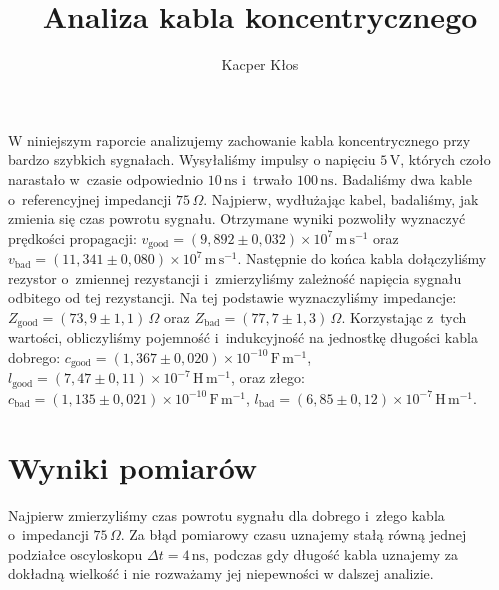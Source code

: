 \documentclass[12pt]{article}
\title{Analiza kabla koncentrycznego}
\author{Kacper Kłos}
\date{}
\begin{document}
\maketitle

W niniejszym raporcie analizujemy zachowanie kabla koncentrycznego przy bardzo szybkich sygnałach. Wysyłaliśmy impulsy o napięciu \(5\,\mathrm{V}\), których czoło narastało w~czasie odpowiednio \(10\,\mathrm{ns}\) i~trwało \(100\,\mathrm{ns}\). Badaliśmy dwa kable o~referencyjnej impedancji \(75\,\Omega\). \newline
Najpierw, wydłużając kabel, badaliśmy, jak zmienia się czas powrotu sygnału. Otrzymane wyniki pozwoliły wyznaczyć prędkości propagacji: \(v_{\mathrm{good}}=(9{,}892\pm0{,}032)\times10^{7}\,\mathrm{m\,s^{-1}}\) oraz \(v_{\mathrm{bad}}=(11{,}341\pm0{,}080)\times10^{7}\,\mathrm{m\,s^{-1}}\). \newline
Następnie do końca kabla dołączyliśmy rezystor o~zmiennej rezystancji i~zmierzyliśmy zależność napięcia sygnału odbitego od tej rezystancji. Na tej podstawie wyznaczyliśmy impedancje: \(Z_{\mathrm{good}}=(73{,}9\pm1{,}1)\,\Omega\) oraz \(Z_{\mathrm{bad}}=(77{,}7\pm1{,}3)\,\Omega\). \newline
Korzystając z~tych wartości, obliczyliśmy pojemność i~indukcyjność na jednostkę długości kabla dobrego: \(c_{\mathrm{good}}=(1{,}367\pm0{,}020)\times10^{-10}\,\mathrm{F\,m^{-1}}\), \(l_{\mathrm{good}}=(7{,}47\pm0{,}11)\times10^{-7}\,\mathrm{H\,m^{-1}}\), oraz złego: \(c_{\mathrm{bad}}=(1{,}135\pm0{,}021)\times10^{-10}\,\mathrm{F\,m^{-1}}\), \(l_{\mathrm{bad}}=(6{,}85\pm0{,}12)\times10^{-7}\,\mathrm{H\,m^{-1}}\).

\newpage

\section{Wyniki pomiarów}
Najpierw zmierzyliśmy czas powrotu sygnału dla dobrego i~złego kabla o~impedancji \(75\,\Omega\).
Za błąd pomiarowy czasu uznajemy stałą równą jednej podziałce oscyloskopu $\Delta t = 4 \, \mathrm{ns}$, podczas gdy długość kabla uznajemy za dokładną wielkość i nie rozważamy jej niepewności w dalszej analizie.
\end{document}
